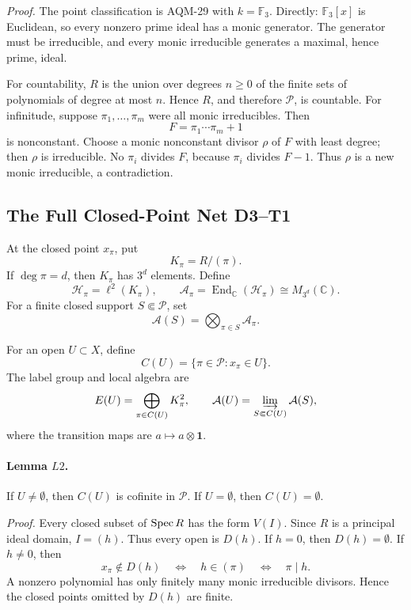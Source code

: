 \emph{Proof.}
The point classification is AQM-29 with \(k=\mathbb F_3\).  Directly:
\(\mathbb F_3[x]\) is Euclidean, so every nonzero prime ideal has a monic
generator.  The generator must be irreducible, and every monic irreducible
generates a maximal, hence prime, ideal.

For countability, \(R\) is the union over degrees \(n\ge0\) of the finite sets
of polynomials of degree at most \(n\).  Hence \(R\), and therefore
\(\mathcal P\), is countable.  For infinitude, suppose
\(\pi_1,\ldots,\pi_m\) were all monic irreducibles.  Then
\[
  F=\pi_1\cdots\pi_m+1
\]
is nonconstant.  Choose a monic nonconstant divisor \(\rho\) of \(F\) with
least degree; then \(\rho\) is irreducible.  No \(\pi_i\) divides \(F\),
because \(\pi_i\) divides \(F-1\).  Thus \(\rho\) is a new monic irreducible, a
contradiction.

\subsection{The Full Closed-Point Net D3--T1}
At the closed point \(x_\pi\), put
\[
  K_\pi=R/(\pi).
\]
If \(\deg\pi=d\), then \(K_\pi\) has \(3^d\) elements.  Define
\[
  \mathcal H_\pi=\ell^2(K_\pi),\qquad
  \mathcal A_\pi=\operatorname{End}_{\mathbb C}(\mathcal H_\pi)
  \cong M_{3^d}(\mathbb C).
\]
For a finite closed support \(S\Subset\mathcal P\), set
\[
  \mathcal A(S)=\bigotimes_{\pi\in S}\mathcal A_\pi.
\]

For an open \(U\subset X\), define
\[
  C(U)=\{\pi\in\mathcal P:x_\pi\in U\}.
\]
The label group and local algebra are
\[
  E(U)=\bigoplus_{\pi\in C(U)}K_\pi^2,
  \qquad
  \mathcal A(U)=
  \varinjlim_{S\Subset C(U)}\mathcal A(S),
\]
where the transition maps are \(a\mapsto a\otimes\mathbf 1\).

\paragraph{Lemma \(L2\).}
If \(U\ne\emptyset\), then \(C(U)\) is cofinite in \(\mathcal P\).  If
\(U=\emptyset\), then \(C(U)=\emptyset\).

\emph{Proof.}
Every closed subset of \(\operatorname{Spec} R\) has the form \(V(I)\).  Since \(R\) is a
principal ideal domain, \(I=(h)\).  Thus every open is \(D(h)\).  If \(h=0\),
then \(D(h)=\emptyset\).  If \(h\ne0\), then
\[
  x_\pi\notin D(h)\quad\Longleftrightarrow\quad h\in(\pi)
  \quad\Longleftrightarrow\quad \pi\mid h.
\]
A nonzero polynomial has only finitely many monic irreducible divisors.  Hence
the closed points omitted by \(D(h)\) are finite.

